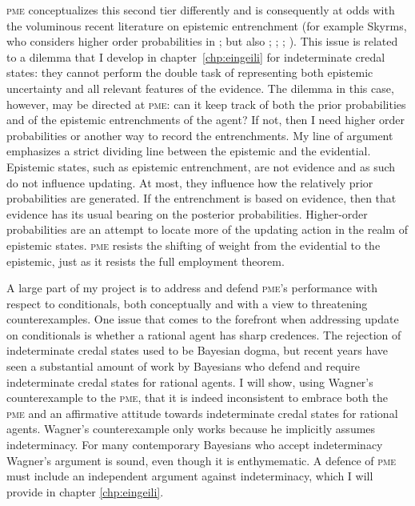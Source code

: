 \documentclass[phd,12pt,oneside]{ubcthesis}
\begin{document}
\textsc{pme} conceptualizes this second tier differently and is
consequently at odds with the voluminous recent literature on
epistemic entrenchment (for example Skyrms, who considers higher order
probabilities in ; but also
; ;
; ). This issue is
related to a dilemma that I develop in chapter~\ref{chp:eingeili} for
indeterminate credal states: they cannot perform the double task of
representing both epistemic uncertainty and all relevant features of
the evidence. The dilemma in this case, however, may be directed at
\textsc{pme}: can it keep track of both the prior probabilities and of
the epistemic entrenchments of the agent? If not, then I need higher
order probabilities or another way to record the entrenchments. My
line of argument emphasizes a strict dividing line between the
epistemic and the evidential. Epistemic states, such as epistemic
entrenchment, are not evidence and as such do not influence updating.
At most, they influence how the relatively prior probabilities are
generated. If the entrenchment is based on evidence, then that
evidence has its usual bearing on the posterior probabilities.
Higher-order probabilities are an attempt to locate more of the
updating action in the realm of epistemic states. \textsc{pme} 
resists the shifting of weight from the evidential to the epistemic,
just as it resists the full employment theorem. 

A large part of my project is to address and defend \textsc{pme}'s
performance with respect to conditionals, both conceptually and with a
view to threatening counterexamples. One issue that comes to the
forefront when addressing update on conditionals is whether a rational
agent has sharp credences. The rejection of indeterminate credal
states used to be Bayesian dogma, but recent years have seen a
substantial amount of work by Bayesians who defend and require
indeterminate credal states for rational agents. I will show, using
Wagner's counterexample to the \textsc{pme}, that it is indeed
inconsistent to embrace both the \textsc{pme} and an affirmative
attitude towards indeterminate credal states for rational agents.
Wagner's counterexample only works because he implicitly assumes
indeterminacy. For many contemporary Bayesians who accept
indeterminacy Wagner's argument is sound, even though it is
enthymematic. A defence of \textsc{pme} must include an independent
argument against indeterminacy, which I will provide in chapter
\ref{chp:eingeili}.
\end{document}
